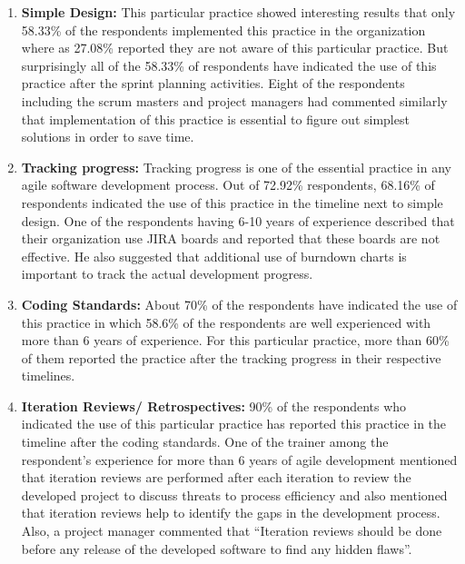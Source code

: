 \documentclass[a4paper,oneside]{bth}
\begin{document}
\begin{enumerate}
\item \textbf{Simple Design:} This particular practice showed interesting results that only 58.33\% of the respondents implemented this practice in the organization where as 27.08\% reported they are not aware of this particular practice. But surprisingly all of the 58.33\% of respondents have indicated the use of this practice after the sprint planning activities. Eight of the respondents including the scrum masters and project managers had commented similarly that implementation of this practice is essential to figure out simplest solutions in order to save time.
\item \textbf{Tracking progress:} Tracking progress is one of the essential practice in any agile software development process. Out of 72.92\% respondents, 68.16\% of respondents indicated the use of this practice in the timeline next to simple design. One of the respondents having 6-10 years of experience described that their organization use JIRA boards and reported that these boards are not effective. He also suggested that additional use of burndown charts is important to track the actual development progress.
\item \textbf{Coding Standards:} About 70\% of the respondents have indicated the use of this practice in which 58.6\% of the respondents are well experienced with more than 6 years of experience. For this particular practice, more than 60\% of them reported the practice after the tracking progress in their respective timelines.
\item \textbf{Iteration Reviews/ Retrospectives:} 90\% of the respondents who indicated the use of this particular practice has reported this practice in the timeline after the coding standards. One of the trainer among the respondent’s experience for more than 6 years of agile development mentioned that iteration reviews are performed after each iteration to review the developed project to discuss threats to process efficiency and also mentioned that iteration reviews help to identify the gaps in the development process. Also, a project manager commented that “Iteration reviews should be done before any release of the developed software to find any hidden flaws”.

\end{enumerate}
\end{document}
